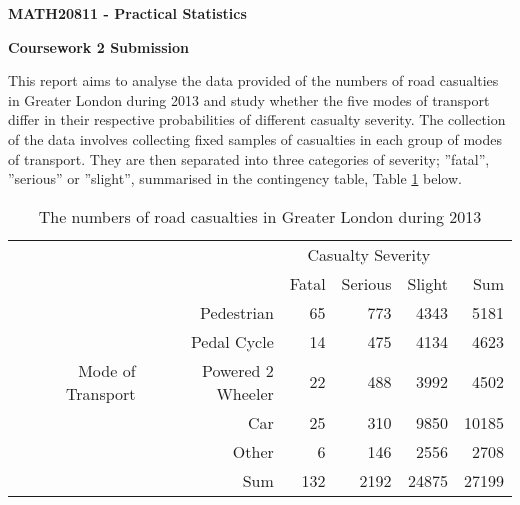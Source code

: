 \documentclass[11pt,a4]{article}
\begin{document}
	
\begin{center}
	\bf{\Large{MATH20811 - Practical Statistics}} 
	\bigskip
	\bigskip
	
		\bf{\Large{Coursework 2 Submission}} 
\end{center}	

\bigskip
\bigskip

This report aims to analyse the data provided of the numbers of road casualties in Greater London during 2013 and study whether the five modes of transport differ in their respective probabilities of different casualty severity. The collection of the data involves collecting fixed samples of casualties in each group of modes of transport. They are then separated into three categories of severity; ”fatal”, ”serious” or ”slight”, summarised in the contingency table, Table \ref{tab1} below.

\begin{table}[ht]
\centering
\begin{tabular}{rr|rrr|r}
    \multicolumn{2}{c}{\multirow{2}{*}{}}&\multicolumn{3}{|c|}{Casualty Severity} \\
    \multicolumn{2}{c|}{}& Fatal & Serious & Slight & Sum\\
  \hline
  \multirow{5}{*}{Mode of Transport} & Pedestrian & 65 & 773 & 4343 & 5181 \\ 
  & Pedal Cycle & 14 & 475 & 4134 & 4623 \\ 
  & Powered 2 Wheeler & 22 & 488 & 3992 & 4502 \\ 
  & Car & 25 & 310 & 9850 & 10185 \\ 
  & Other & 6 & 146 & 2556 & 2708 \\ 
  \hline
  & Sum & 132 & 2192 & 24875 & 27199 \\ 
   \hline
\end{tabular}
\caption{The  numbers  of  road  casualties  in  Greater London during 2013}
\label{tab1}
\end{table}
\end{document}
